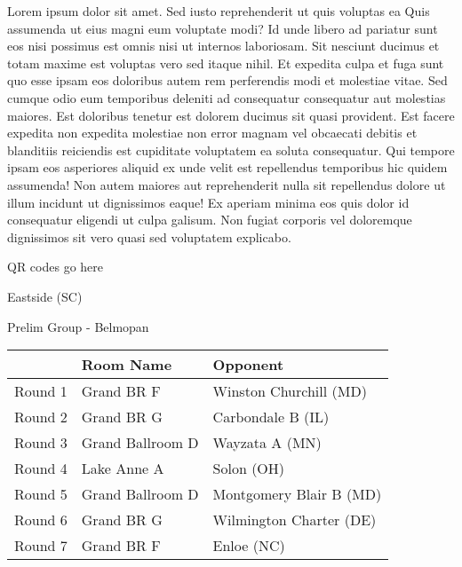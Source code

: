 \documentclass{article}%
\begin{document}
\vspace*{8pt}%
\linebreak%
\newline%
\newline%
Lorem ipsum dolor sit amet. Sed iusto reprehenderit ut quis voluptas ea Quis assumenda ut eius magni eum voluptate modi? Id unde libero ad pariatur sunt eos nisi possimus est omnis nisi ut internos laboriosam. Sit nesciunt ducimus et totam maxime est voluptas vero sed itaque nihil. Et expedita culpa et fuga sunt quo esse ipsam eos doloribus autem rem perferendis modi et molestiae vitae.\newline%
\newline%
Sed cumque odio eum temporibus deleniti ad consequatur consequatur aut molestias maiores. Est doloribus tenetur est dolorem ducimus sit quasi provident. Est facere expedita non expedita molestiae non error magnam vel obcaecati debitis et blanditiis reiciendis est cupiditate voluptatem ea soluta consequatur. Qui tempore ipsam eos asperiores aliquid ex unde velit est repellendus temporibus hic quidem assumenda!\newline%
\newline%
Non autem maiores aut reprehenderit nulla sit repellendus dolore ut illum incidunt ut dignissimos eaque! Ex aperiam minima eos quis dolor id consequatur eligendi ut culpa galisum. Non fugiat corporis vel doloremque dignissimos sit vero quasi sed voluptatem explicabo.\newline%
\newline%
%
\vspace*{30pt}%
\begin{center}%
\begin{Huge}%
QR codes go here%
\end{Huge}%
\end{center}%
\newpage%
%
\begin{center}%
\begin{Huge}%
Eastside (SC)%
\end{Huge}%
\vspace*{8pt}%
\linebreak%
\begin{Large}%
Prelim Group {-} Belmopan%
\end{Large}%
\end{center}%
\begin{tabularx}{\textwidth}{|c|Y|Y|}%
\hline%
&Room Name&Opponent\\%
\hline%
Round 1&Grand BR F&Winston Churchill (MD)\\%
Round 2&Grand BR G&Carbondale B (IL)\\%
Round 3&Grand Ballroom D&Wayzata A (MN)\\%
Round 4&Lake Anne A&Solon (OH)\\%
Round 5&Grand Ballroom D&Montgomery Blair B (MD)\\%
Round 6&Grand BR G&Wilmington Charter (DE)\\%
Round 7&Grand BR F&Enloe (NC)\\%
\hline%
\end{tabularx}%
\end{document}
